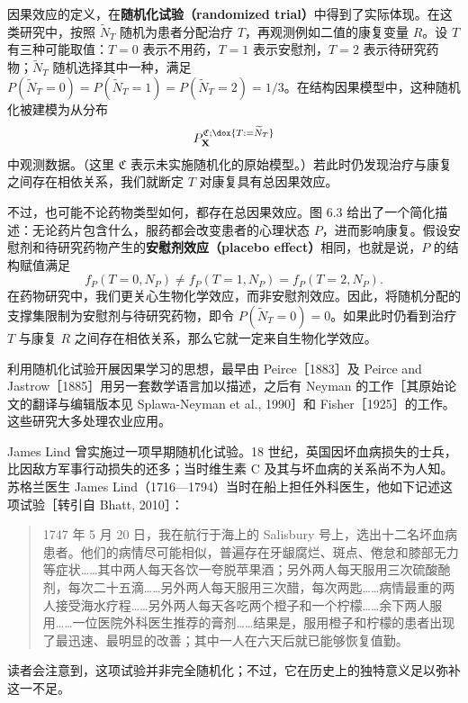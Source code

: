 \begin{example}[随机化试验]
因果效应的定义，在\textbf{随机化试验（randomized trial）}中得到了实际体现。在这类研究中，按照 $\widetilde N_T$ 随机为患者分配治疗 $T$，再观测例如二值的康复变量 $R$。设 $T$ 有三种可能取值：$T=0$ 表示不用药，$T=1$ 表示安慰剂，$T=2$ 表示待研究药物；$\widetilde N_T$ 随机选择其中一种，满足 $P(\widetilde N_T=0)=P(\widetilde N_T=1)=P(\widetilde N_T=2)=1/3$。在结构因果模型中，这种随机化被建模为从分布
\[
 P_{\mathbf X}^{\mathfrak C;\dox{T:=\widetilde N_T}}
\]
中观测数据。（这里 $\mathfrak C$ 表示未实施随机化的原始模型。）若此时仍发现治疗与康复之间存在相依关系，我们就断定 $T$ 对康复具有总因果效应。

不过，也可能不论药物类型如何，都存在总因果效应。图 6.3 给出了一个简化描述：无论药片包含什么，服药都会改变患者的心理状态 $P$，进而影响康复。假设安慰剂和待研究药物产生的\textbf{安慰剂效应（placebo effect）}相同，也就是说，$P$ 的结构赋值满足
\[
 f_P(T=0,N_P)\ne f_P(T=1,N_P)=f_P(T=2,N_P).
\]
在药物研究中，我们更关心生物化学效应，而非安慰剂效应。因此，将随机分配的支撑集限制为安慰剂与待研究药物，即令 $P(\widetilde N_T=0)=0$。如果此时仍看到治疗 $T$ 与康复 $R$ 之间存在相依关系，那么它就一定来自生物化学效应。



利用随机化试验开展因果学习的思想，最早由 Peirce［1883］及 Peirce and Jastrow［1885］用另一套数学语言加以描述，之后有 Neyman 的工作［其原始论文的翻译与编辑版本见 Splawa-Neyman et al., 1990］和 Fisher［1925］的工作。这些研究大多处理农业应用。

James Lind 曾实施过一项早期随机化试验。18 世纪，英国因坏血病损失的士兵，比因敌方军事行动损失的还多；当时维生素 C 及其与坏血病的关系尚不为人知。苏格兰医生 James Lind（1716—1794）当时在船上担任外科医生，他如下记述这项试验［转引自 Bhatt, 2010］：
\begin{quote}
1747 年 5 月 20 日，我在航行于海上的 Salisbury 号上，选出十二名坏血病患者。他们的病情尽可能相似，普遍存在牙龈腐烂、斑点、倦怠和膝部无力等症状……其中两人每天各饮一夸脱苹果酒；另外两人每天服用三次硫酸酏剂，每次二十五滴……另外两人每天服用三次醋，每次两匙……病情最重的两人接受海水疗程……另外两人每天各吃两个橙子和一个柠檬……余下两人服用……一位医院外科医生推荐的膏剂……结果是，服用橙子和柠檬的患者出现了最迅速、最明显的改善；其中一人在六天后就已能够恢复值勤。
\end{quote}
读者会注意到，这项试验并非完全随机化；不过，它在历史上的独特意义足以弥补这一不足。
\end{example}

